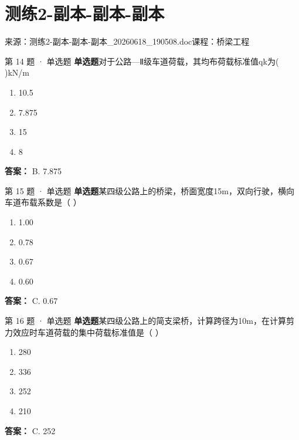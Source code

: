 \documentclass[UTF8,zihao=-4,openany]{ctexbook}
\newenvironment{choices}{\begin{enumerate}[label=\Alph*.,leftmargin=9mm,labelsep=3mm,itemsep=2pt,topsep=4pt]}{\end{enumerate}}
\newcommand{\qtype}[1]{\textcolor{brand}{\sffamily\bfseries #1}}
\newcommand{\sourcefile}[1]{\textcolor{muted}{\small\sffamily 来源：#1}}
\begin{document}
\chapter{测练2-副本-副本-副本}

\sourcefile{测练2-副本-副本-副本\_20260618\_190508.doc}\quad \textcolor{muted}{\small\sffamily 课程：桥梁工程}

\begin{questionbox}{第 14 题 · 单选题}
\qtype{单选题}\quad 对于公路—Ⅱ级车道荷载，其均布荷载标准值qk为( )kN/m
\begin{choices}
\item 10.5
\item 7.875
\item 15
\item 8
\end{choices}
\begin{answerbox}
\textbf{答案：} B. 7.875
\end{answerbox}
\end{questionbox}

\begin{questionbox}{第 15 题 · 单选题}
\qtype{单选题}\quad 某四级公路上的桥梁，桥面宽度15m，双向行驶，横向车道布载系数是（ ）
\begin{choices}
\item 1.00
\item 0.78
\item 0.67
\item 0.60
\end{choices}
\begin{answerbox}
\textbf{答案：} C. 0.67
\end{answerbox}
\end{questionbox}

\begin{questionbox}{第 16 题 · 单选题}
\qtype{单选题}\quad 某四级公路上的简支梁桥，计算跨径为10m，在计算剪力效应时车道荷载的集中荷载标准值是（ ）
\begin{choices}
\item 280
\item 336
\item 252
\item 210
\end{choices}
\begin{answerbox}
\textbf{答案：} C. 252
\end{answerbox}
\end{questionbox}
\end{document}
